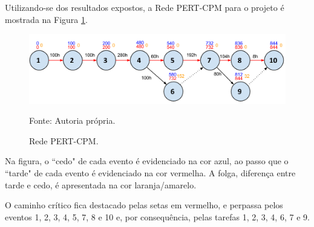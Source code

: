 Utilizando-se dos resultados expostos, a Rede PERT-CPM para o projeto é mostrada na Figura \ref{fig:pertcpm}.

\begin{figure}[h]
\begin{center}
    \includegraphics[width=1\columnwidth]{../figs/pert-cpm.png}
    \caption{Rede PERT-CPM.}Fonte: Autoria própria.%
    \label{fig:pertcpm}
\end{center}
\end{figure}

Na figura, o ``cedo" de cada evento é evidenciado na cor azul, ao passo que o ``tarde" de cada evento é evidenciado na cor vermelha. A folga, diferença entre tarde e cedo, é apresentada na cor laranja/amarelo.

O caminho crítico fica destacado pelas setas em vermelho, e perpassa pelos eventos 1, 2, 3, 4, 5, 7, 8 e 10 e, por consequência, pelas tarefas 1, 2, 3, 4, 6, 7 e 9.